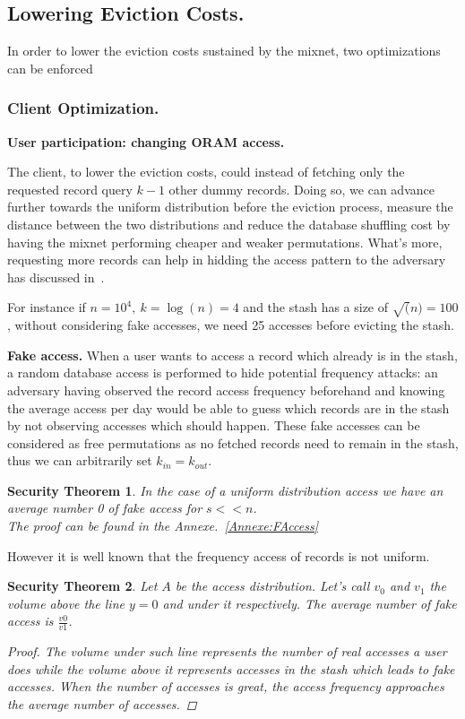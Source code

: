 \documentclass[a4paper]{article}
\newtheorem{secthm}{Security Theorem}
\begin{document}
\subsection{Lowering Eviction Costs.}

In order to lower the eviction costs sustained by the mixnet, two optimizations can be enforced

\subsubsection{Client Optimization.}
\textbf{User participation: changing ORAM access.}

The client, to lower the eviction costs, could instead of fetching only the requested record query $k-1$ other dummy records. Doing so, we can advance further towards the uniform distribution before the eviction process, measure the distance between the two distributions and reduce the database shuffling cost by having the mixnet performing cheaper and weaker permutations.
What's more, requesting more records can help in hidding the access pattern to the adversary has discussed in~\cite{Lower cost PIR}.

For instance if $n=10^4,\ k=\log(n)=4$ and the stash has a size of $\sqrt(n)=100$, without considering fake accesses, we need 25 accesses before evicting the stash.

\textbf{Fake access.}
When a user wants to access a record which already is in the stash, a random database access is performed to hide potential frequency attacks: an adversary having observed the record access frequency beforehand and knowing the average access per day would be able to guess which records are in the stash by not observing accesses which should happen.
These fake accesses can be considered as free permutations as no fetched records need to remain in the stash, thus we can arbitrarily set $k_{in}=k_{out}$.

\begin{secthm}
In the case of a uniform distribution access we have an average number 0 of fake access for $s<<n$.\\
The proof can be found in the Annexe.~\ref{Annexe:FAccess}
\end{secthm}

However it is well known that the frequency access of records is not uniform.
\begin{secthm}
Let $A$ be the access distribution. Let's call $v_0$ and $v_1$ the volume above the line $y=0$ and under it respectively.
The average number of fake access is $ \frac{v0}{v1}$.
\begin{proof}
 The volume under such line represents the number of real accesses a user does while the volume above it represents accesses in the stash which leads to fake accesses.
 When the number of accesses is great, the access frequency approaches the average number of accesses.
\end{proof}
\end{secthm}
\end{document}
